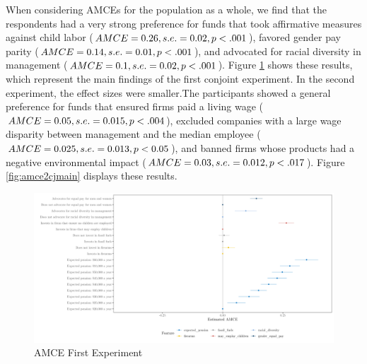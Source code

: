 \documentclass[
  12pt,
]{article}
\begin{document}
When considering AMCEs for the population as a whole, we find that the respondents had a very strong preference for funds that took affirmative measures against child labor (\(AMCE = 0.26, \space s.e. = 0.02, \space p < .001\)), favored gender pay parity (\(AMCE = 0.14, \space s.e. = 0.01, \space p < .001\)), and advocated for racial diversity in management (\(AMCE = 0.1, \space s.e. =0.02, \space p < .001\)). Figure \ref{fig:amce1cjmain} shows these results, which represent the main findings of the first conjoint experiment. In the second experiment, the effect sizes were smaller.The participants showed a general preference for funds that ensured firms paid a living wage (\(AMCE = 0.05, \space s.e. = 0.015, \space p < .004\)), excluded companies with a large wage disparity between management and the median employee (\(AMCE = 0.025, \space s.e. = 0.013, \space p <0.05\)), and banned firms whose products had a negative environmental impact (\(AMCE = 0.03, \space s.e. = 0.012, \space p < .017\)). Figure \ref{fig:amce2cjmain} displays these results.

\begin{landscape}

\begin{figure}

{\centering \includegraphics{amcecj1jmain} 

}

\caption{AMCE First Experiment}\label{fig:amce1cjmain}
\end{figure}
\end{landscape}
\end{document}
